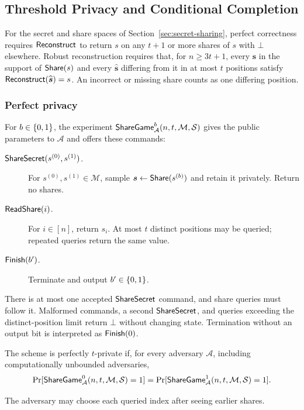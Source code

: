 \subsection{Threshold Privacy and Conditional Completion}
\label{app:secret-sharing}

For the secret and share spaces of Section~\ref{sec:secret-sharing},
perfect correctness requires $\mathsf{Reconstruct}$ to return $s$ on any $t+1$
or more shares of $s$ with $\bot$ elsewhere.  Robust reconstruction
requires that, for $n\geq 3t+1$, every $\boldsymbol{s}$ in the support of
$\mathsf{Share}(s)$ and every $\widehat{\boldsymbol{s}}$ differing from it in at
most $t$ positions satisfy $\mathsf{Reconstruct}(\widehat{\boldsymbol{s}})=s$.
An incorrect or missing share counts as one differing position.

\subsubsection{Perfect privacy}
For $b\in\{0,1\}$, the experiment
$\mathsf{ShareGame}^b_{\mathcal A}(n,t,\mathcal M,\mathcal S)$ gives the public parameters
to $\mathcal A$ and offers these commands:
\begin{description}
  \item[$\mathsf{ShareSecret}(s^{(0)},s^{(1)})$.]
    For $s^{(0)},s^{(1)}\in\mathcal M$, sample
    $\boldsymbol{s}\mathrel{\leftarrow}\mathsf{Share}(s^{(b)})$ and retain it privately.
    Return no shares.
  \item[$\mathsf{ReadShare}(i)$.]
    For $i\in[n]$, return $s_i$.  At most $t$ distinct positions may
    be queried; repeated queries return the same value.
  \item[$\mathsf{Finish}(b')$.]
    Terminate and output $b'\in\{0,1\}$.
\end{description}
There is at most one accepted $\mathsf{ShareSecret}$ command, and share queries
must follow it.  Malformed commands, a second $\mathsf{ShareSecret}$, and queries
exceeding the distinct-position limit return $\bot$ without changing
state.  Termination without an output bit is interpreted as $\mathsf{Finish}(0)$.

\begin{definition}
\label{def:sharing-privacy}
The scheme is perfectly $t$-private if, for every adversary
$\mathcal A$, including computationally unbounded adversaries,
\[
  \Pr[\mathsf{ShareGame}^0_{\mathcal A}(n,t,\mathcal M,\mathcal S)=1]
  =\Pr[\mathsf{ShareGame}^1_{\mathcal A}(n,t,\mathcal M,\mathcal S)=1].
\]
\end{definition}
The adversary may choose each queried index after seeing earlier shares.

